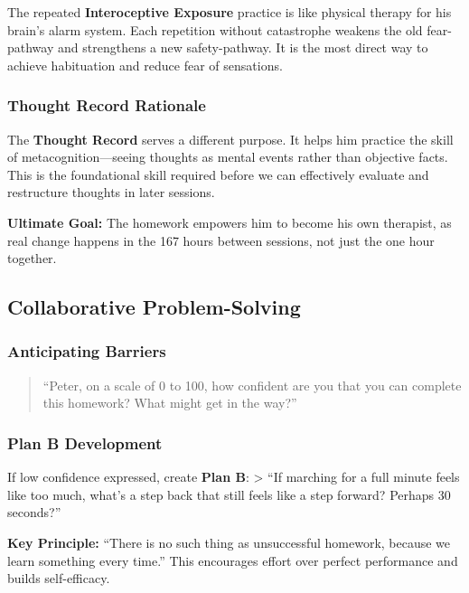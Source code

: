 \documentclass[
  american,
  11pt,
  11pt,
  letterpaper,
  onecolumn]{article}
\begin{document}
The repeated \textbf{Interoceptive Exposure} practice is like physical
therapy for his brain's alarm system. Each repetition without
catastrophe weakens the old fear-pathway and strengthens a new
safety-pathway. It is the most direct way to achieve habituation and
reduce fear of sensations.

\subsubsection{Thought Record Rationale}\label{thought-record-rationale}

The \textbf{Thought Record} serves a different purpose. It helps him
practice the skill of metacognition---seeing thoughts as mental events
rather than objective facts. This is the foundational skill required
before we can effectively evaluate and restructure thoughts in later
sessions.

\textbf{Ultimate Goal:} The homework empowers him to become his own
therapist, as real change happens in the 167 hours between sessions, not
just the one hour together.

\subsection{Collaborative
Problem-Solving}\label{collaborative-problem-solving}

\subsubsection{Anticipating Barriers}\label{anticipating-barriers}

\begin{quote}
``Peter, on a scale of 0 to 100, how confident are you that you can
complete this homework? What might get in the way?''
\end{quote}

\subsubsection{Plan B Development}\label{plan-b-development}

If low confidence expressed, create \textbf{Plan B}: \textgreater{} ``If
marching for a full minute feels like too much, what's a step back that
still feels like a step forward? Perhaps 30 seconds?''

\textbf{Key Principle:} ``There is no such thing as unsuccessful
homework, because we learn something every time.'' This encourages
effort over perfect performance and builds self-efficacy.
\end{document}
